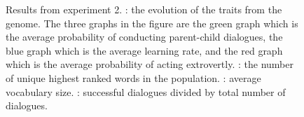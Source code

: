 \begin{figure}
    \centering
    \ContinuedFloat
    \hfill
    \par \bigskip
    \hfill
    \caption{Results from experiment 2. : the evolution of the traits from the genome. The three graphs in the figure are the green graph which is the average probability of conducting parent-child dialogues, the blue graph which is the average learning rate, and the  red graph which is the average probability of acting extrovertly. : the number of unique highest ranked words in the population. : average vocabulary size. : successful dialogues divided by total number of dialogues.}
    \label{fig:exp2.1}
\end{figure}

